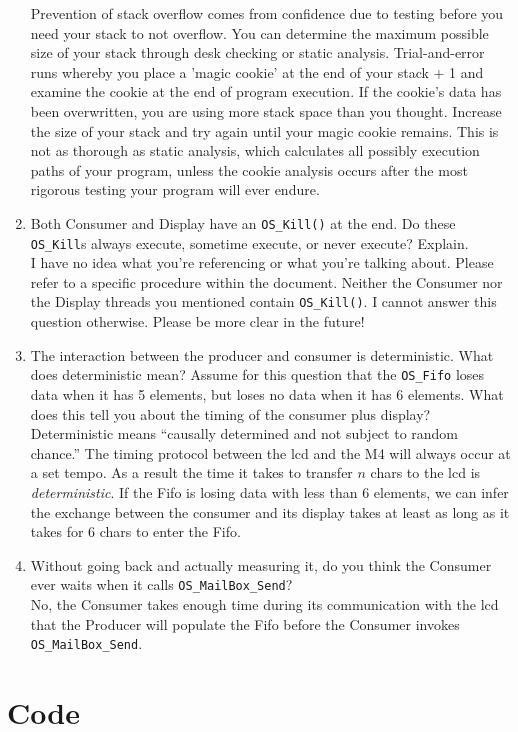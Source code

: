 \documentclass[12pt]{article}
\begin{document}
\begin{enumerate}[1)]
  Prevention of stack overflow comes from confidence due to testing
  before you need your stack to not overflow. You can determine the
  maximum possible size of your stack through desk checking or static
  analysis. Trial-and-error runs whereby you place a 'magic cookie' at
  the end of your stack + 1 and examine the cookie at the end of
  program execution. If the cookie's data has been overwritten, you
  are using more stack space than you thought. Increase the size of
  your stack and try again until your magic cookie remains. This is
  not as thorough as static analysis, which calculates all possibly
  execution paths of your program, unless the cookie analysis occurs
  after the most rigorous testing your program will ever endure.
\item Both Consumer and Display have an \verb|OS_Kill()| at the end. Do these
  \verb|OS_Kill|s always execute, sometime execute, or never execute?
  Explain. \\
  I have no idea what you're referencing or what you're talking
  about. Please refer to a specific procedure within the
  document. Neither the Consumer nor the Display threads you mentioned
  contain \verb|OS_Kill()|. I cannot answer this question otherwise. Please
  be more clear in the future!
\item The interaction between the producer and consumer is
  deterministic. What does deterministic mean? Assume for this
  question that the \verb|OS_Fifo| loses data when it has 5 elements, but
  loses no data when it has 6 elements. What does this tell you about
  the timing of the consumer plus display? \\
  Deterministic means ``causally determined and not subject to random
  chance.'' The timing protocol between the lcd and the M4 will always
  occur at a set tempo. As a result the time it takes to transfer $n$
  chars to the lcd is \emph{deterministic}. If the Fifo is losing data
  with less than 6 elements, we can infer the exchange between the
  consumer and its display takes at least as long as it takes for 6
  chars to enter the Fifo.
\item Without going back and actually measuring it, do you think the
  Consumer ever waits when it calls \verb|OS_MailBox_Send|? \\
  No, the Consumer takes enough time during its communication with the
  lcd that the Producer will populate the Fifo before the Consumer
  invokes \verb|OS_MailBox_Send|.
\end{enumerate}

\section{Code}



\end{document}
